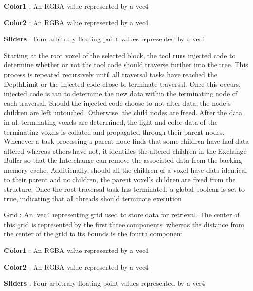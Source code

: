 \documentclass[onecolumn, draftclsnofoot,10pt, compsoc]{IEEEtran}
\newcounter{threesection}[subsubsection]
\newcounter{foursection}[threesection]
\begin{document}


\noindent \textbf{Color1} : An RGBA value represented by a vec4

\noindent \textbf{Color2} : An RGBA value represented by a vec4

\noindent \textbf{Sliders} : Four arbitrary floating point values represented by a vec4


Starting at the root voxel of the selected block, the tool runs injected code to determine whether or not the tool code should traverse further into the tree. This process is repeated recursively until all traversal tasks have reached the DepthLimit or the injected code chose to terminate traversal. Once this occurs, injected code is ran to determine the new data within the terminating node of each traversal. Should the injected code choose to not alter data, the node’s children are left untouched. Otherwise, the child nodes are freed. After the data in all terminating voxels are determined, the light and color data of the terminating voxels is collated and propagated through their parent nodes. Whenever a task processing a parent node finds that some children have had data altered whereas others have not, it identifies the altered children in the Exchange Buffer so that the Interchange can remove the associated data from the backing memory cache. Additionally, should all the children of a voxel have data identical to their parent and no children, the parent voxel’s children are freed from the structure. Once the root traversal task has terminated, a global boolean is set to true, indicating that all threads should terminate execution.




Grid : An ivec4 representing grid used to store data for retrieval. The center of this grid is represented by the first three components, whereas the distance from the center of the grid to its bounds is the fourth component

\noindent \textbf{Color1} : An RGBA value represented by a vec4

\noindent \textbf{Color2} : An RGBA value represented by a vec4

\noindent \textbf{Sliders} : Four arbitrary floating point values represented by a vec4

\end{document}
